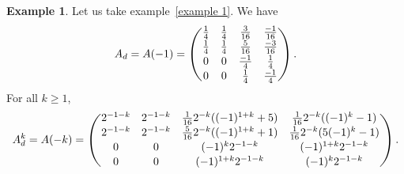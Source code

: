 \documentclass[12pt]{amsart}
\theoremstyle{definition}
\newtheorem{example}[thrm]{Example}
\numberwithin{equation}{section}
\numberwithin{equation}{section}
\begin{document}
\begin{example} Let us take example~\ref{example 1}. We have
$$A_{d}=A(-1)=\begin{pmatrix}
\frac{1}{4}&\frac{1}{4}&\frac{3}{16}&\frac{-1}{16}\vspace*{0.1pc}\\
\frac{1}{4}&\frac{1}{4}&\frac{5}{16}&\frac{-3}{16}\vspace*{0.1pc}\\
0&0&\frac{-1}{4}&\frac{1}{4}\vspace*{0.1pc}\\
0&0&\frac{1}{4}&\frac{-1}{4}
\end{pmatrix}.$$
For all $k\geq 1$,
$$A_{d}^{k}=A(-k)=\begin{pmatrix}
2^{-1-k}&2^{-1-k}&\frac{1}{16}2^{-k}((-1)^{1+k}+5)&\frac{1}{16}2^{-k}((-1)^{k}-1)\vspace*{0.1pc}\\
2^{-1-k}&2^{-1-k}&\frac{5}{16}2^{-k}((-1)^{1+k}+1)&\frac{1}{16}2^{-k}(5(-1)^{k}-1)\vspace*{0.1pc}\\
0&0&(-1)^{k}2^{-1-k}&(-1)^{1+k}2^{-1-k}\vspace*{0.1pc}\\
0&0&(-1)^{1+k}2^{-1-k}&(-1)^{k}2^{-1-k}
\end{pmatrix}.$$
\end{example}
\end{document}
